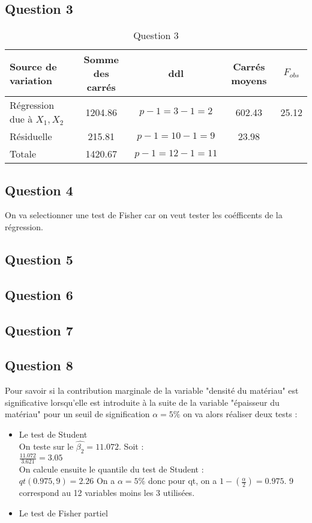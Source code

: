 \documentclass{article}
\begin{document}
\subsection{Question 3}
\begin{table}[!ht]
  \centering
  \footnotesize
  \begin{tabular}{lcccc}\toprule
    Source de variation & Somme des carrés & ddl & Carrés moyens & \(F_{obs}\)\\\midrule
    Régression due à \(X_{1}, X_{2}\) & 1204.86 & \(p - 1 = 3 - 1 = 2\) & 602.43 & 25.12\\
    Résiduelle & 215.81 & \(p - 1 = 10 - 1 = 9\) & 23.98\\
    Totale & 1420.67 & \(p - 1 = 12 - 1 = 11\)\\\bottomrule
  \end{tabular}
  \caption{Question 3}\label{tab:table}
\end{table}
\subsection{Question 4}
On va selectionner une test de Fisher car on veut tester les coéfficents de la régression. 
\subsection{Question 5}
\subsection{Question 6}
\subsection{Question 7}
\subsection{Question 8}
Pour  savoir si la contribution marginale de la variable "densité du matériau" est significative lorsqu'elle est introduite à la suite de la variable "épaisseur du matériau" pour un seuil de signification \(\alpha = 5\%\) on va alors réaliser deux tests :
\begin{itemize}
	\item Le test de Student\\
	On teste sur le \(\widehat{\beta_{2}}\)\( = 11.072\). Soit :\\
	\(\frac{11.072}{3.621} = 3.05\)\\
	On calcule ensuite le quantile du test de Student :\\
	\(qt(0.975, 9) = 2.26\) On a $\alpha = 5\%$ donc pour qt, on a \(1 - (\frac{\alpha}{2}) = 0.975\). 9 correspond au 12 variables moins les 3 utilisées.
	\item Le test de Fisher partiel
\end{itemize}
\end{document}

